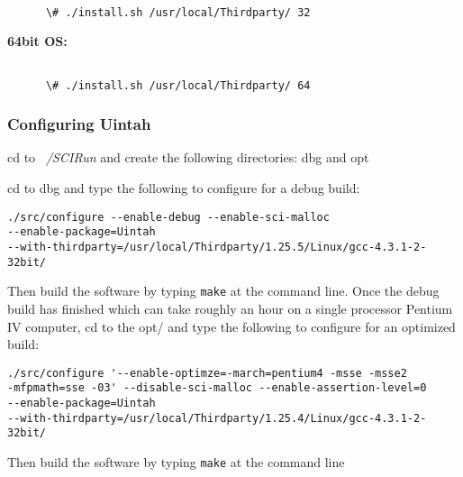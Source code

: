\begin{verbatim}

      \# ./install.sh /usr/local/Thirdparty/ 32

\end{verbatim}

\textbf{64bit OS:}


\begin{verbatim}

      \# ./install.sh /usr/local/Thirdparty/ 64

\end{verbatim}


\subsubsection{Configuring Uintah}

cd to \emph{~/SCIRun} and create the following directories: dbg and opt

cd to dbg and type the following to configure for a debug build:

\begin{verbatim}
./src/configure --enable-debug --enable-sci-malloc 
--enable-package=Uintah 
--with-thirdparty=/usr/local/Thirdparty/1.25.5/Linux/gcc-4.3.1-2-32bit/
\end{verbatim}

Then build the software by typing \texttt{make} at the command
line. Once the debug build has finished which can take roughly an hour
on a single processor Pentium IV computer, cd to the opt/ and type the
following to configure for an optimized build:

\begin{verbatim}
./src/configure '--enable-optimze=-march=pentium4 -msse -msse2 
-mfpmath=sse -03' --disable-sci-malloc --enable-assertion-level=0 
--enable-package=Uintah 
--with-thirdparty=/usr/local/Thirdparty/1.25.4/Linux/gcc-4.3.1-2-32bit/
\end{verbatim}

Then build the software by typing \texttt{make} at the command line



